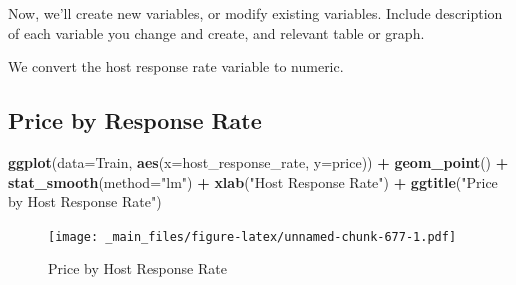 \documentclass[]{book}
\newenvironment{Shaded}{\begin{snugshade}}{\end{snugshade}}
\newcommand{\KeywordTok}[1]{\textcolor[rgb]{0.13,0.29,0.53}{\textbf{#1}}}
\newcommand{\DataTypeTok}[1]{\textcolor[rgb]{0.13,0.29,0.53}{#1}}
\newcommand{\StringTok}[1]{\textcolor[rgb]{0.31,0.60,0.02}{#1}}
\newcommand{\OperatorTok}[1]{\textcolor[rgb]{0.81,0.36,0.00}{\textbf{#1}}}
\newcommand{\NormalTok}[1]{#1}
\begin{document}
Now, we'll create new variables, or modify existing variables. Include
description of each variable you change and create, and relevant table
or graph.

We convert the host response rate variable to numeric.

\begin{Shaded}
\end{Shaded}

\subsection{Price by Response Rate}\label{price-by-response-rate}

\begin{Shaded}
\begin{Highlighting}[]
\KeywordTok{ggplot}\NormalTok{(}\DataTypeTok{data=}\NormalTok{Train, }\KeywordTok{aes}\NormalTok{(}\DataTypeTok{x=}\NormalTok{host_response_rate, }\DataTypeTok{y=}\NormalTok{price)) }\OperatorTok{+}\StringTok{ }\KeywordTok{geom_point}\NormalTok{() }\OperatorTok{+}\StringTok{ }
\StringTok{  }\KeywordTok{stat_smooth}\NormalTok{(}\DataTypeTok{method=}\StringTok{"lm"}\NormalTok{) }\OperatorTok{+}\StringTok{ }\KeywordTok{xlab}\NormalTok{(}\StringTok{"Host Response Rate"}\NormalTok{) }\OperatorTok{+}\StringTok{ }\KeywordTok{ggtitle}\NormalTok{(}\StringTok{"Price by Host Response Rate"}\NormalTok{)}
\end{Highlighting}
\end{Shaded}

\begin{figure}
\centering
\texttt{[image: \_main\_files/figure-latex/unnamed-chunk-677-1.pdf]}
\caption{\label{fig:unnamed-chunk-677}Price by Host Response Rate}
\end{figure}
\end{document}
